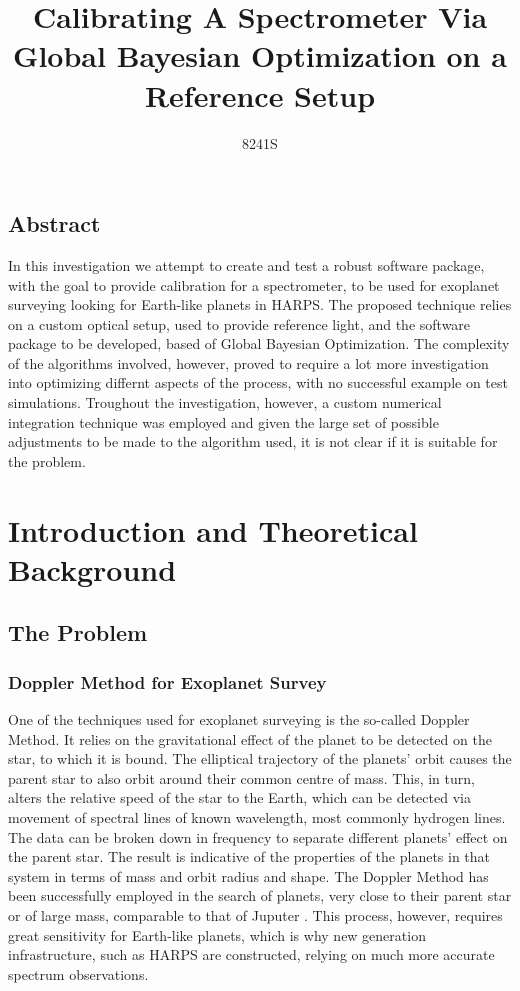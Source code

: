 \documentclass[12pt]{article}
\begin{document}
\title{Calibrating A Spectrometer Via Global Bayesian Optimization on a Reference Setup}
\author{8241S}
\maketitle

\begin{center}
    \section*{Abstract}
    In this investigation we attempt to create and test a robust software package,
    with the goal to provide calibration for a spectrometer, to be used for exoplanet
    surveying looking for Earth-like planets in HARPS. The proposed technique relies on a
    custom optical setup, used to provide reference light, and the software package to
    be developed, based of Global Bayesian Optimization. The complexity of the 
    algorithms involved, however, proved to require a lot more investigation into 
    optimizing differnt aspects of the process, with no successful example on 
    test simulations. Troughout the investigation, however, a custom numerical integration
    technique was employed and given the large set of possible adjustments to be made to 
    the algorithm used, it is not clear if it is suitable for the problem.
\end{center}

\section{Introduction and Theoretical Background} 
    \subsection{The Problem}

    \subsubsection*{Doppler Method for Exoplanet Survey}
        One of the techniques used for exoplanet surveying is the so-called
        Doppler Method. It relies on the gravitational effect of the planet to 
        be detected on the star, to which it is bound. The elliptical trajectory
        of the planets' orbit causes the parent star to also orbit around their common
        centre of mass. This, in turn, alters the relative speed of the star to the
        Earth, which can be detected via movement of spectral lines of known wavelength,
        most commonly hydrogen lines. The data can be broken down in frequency
        to separate different planets' effect on the parent star. The result is 
        indicative of the properties of the planets in that system in terms of mass 
        and orbit radius and shape. The Doppler Method has been successfully employed 
        in the search of planets, very close to their parent star or of large mass,
        comparable to that of Juputer \cite{exoplanets}. This process, however, requires
        great sensitivity for Earth-like planets, which is why new generation infrastructure,
        such as HARPS are constructed, relying on much more accurate spectrum observations.
        
\end{document}
